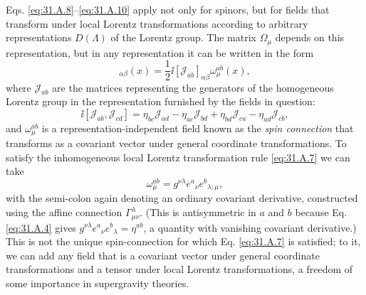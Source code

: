 Eqs. \eqref{eq:31.A.8}--\eqref{eq:31.A.10} apply not only for spinors,
but for fields that transform under local Lorentz transformations
according to arbitrary representations \(D(\Lambda)\) of the Lorentz
group. The matrix \(\Omega_\mu\) depends on this representation, but in
any representation it can be written in the form
\begin{equation}
  [\Omega_\mu]_{\alpha\beta}(x)
  =\frac{1}{2}\ii[\mathscr{J}_{ab}]_{\alpha\beta}\omega_\mu^{ab}(x),
  \tag{31.A.11}\label{eq:31.A.11}
\end{equation}
where \(\mathscr{J}_{ab}\) are the matrices representing the generators
of the homogeneous Lorentz group in the representation furnished by the
fields in question:
\begin{equation}
  \ii[\mathscr{J}_{ab},\mathscr{J}_{cd}]
  =\eta_{bc}\mathscr{J}_{ad}
   -\eta_{ac}\mathscr{J}_{bd}
   +\eta_{bd}\mathscr{J}_{ca}
   -\eta_{ad}\mathscr{J}_{cb},
  \tag{31.A.12}\label{eq:31.A.12}
\end{equation}
and \(\omega_\mu^{ab}\) is a representation-independent field known as
the \emph{spin connection} that transforms as a covariant vector under
general coordinate transformations. To satisfy the inhomogeneous local
Lorentz transformation rule \eqref{eq:31.A.7} we can take
\begin{equation}
  \omega_\mu^{ab}
  =g^{\nu\lambda}e^a{}_\nu e^b{}_{\lambda;\mu},
  \tag{31.A.13}\label{eq:31.A.13}
\end{equation}
with the semi-colon again denoting an ordinary covariant derivative,
constructed using the affine connection \(\Gamma^\lambda_{\mu\nu}\).
(This is antisymmetric in \(a\) and \(b\) because Eq.
\eqref{eq:31.A.4} gives
\(g^{\nu\lambda}e^a{}_\nu e^b{}_\lambda=\eta^{ab}\), a quantity with
vanishing covariant derivative.) This is not the unique spin-connection
for which Eq. \eqref{eq:31.A.7} is satisfied; to it, we can add any field
that is a covariant vector under general coordinate transformations and
a tensor under local Lorentz transformations, a freedom of some
importance in supergravity theories.

